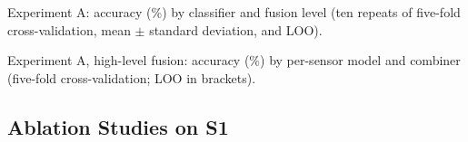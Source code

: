 \documentclass[12pt]{article}
\begin{document}
\begin{table}[!htbp]
\centering
\caption[Experiment A: accuracy by classifier and fusion level]{Experiment A: accuracy (\%) by classifier and fusion level (ten repeats of five-fold cross-validation, mean $\pm$ standard deviation, and LOO).}
\label{tab:expA}
\footnotesize

\end{table}

\begin{table}[!htbp]
\centering
\caption[Experiment A: high-level fusion by per-sensor model and combiner]{Experiment A, high-level fusion: accuracy (\%) by per-sensor model and combiner (five-fold cross-validation; LOO in brackets).}
\label{tab:expAhigh}
\footnotesize
\begin{adjustbox}{max width=\textwidth}

\end{adjustbox}
\end{table}

\subsection{Ablation Studies on S1}
\label{sec:ablations}
\end{document}
